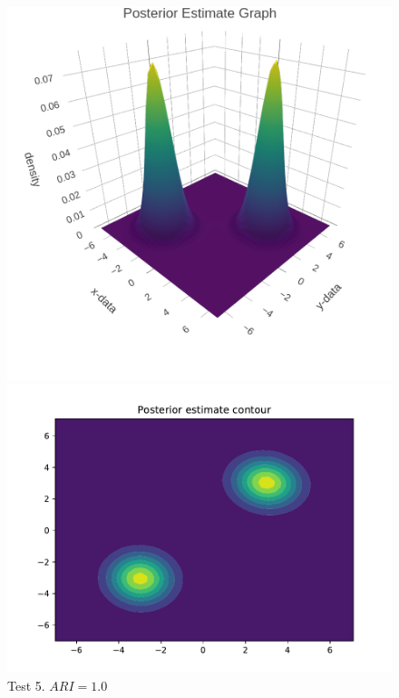 \begin{figure}[h]
	\centering
	\begin{minipage}{0.5\textwidth}
		\includegraphics[scale=0.5]{etc/test5_dens.png} %
	\end{minipage}%
	\begin{minipage}{0.5\textwidth}
		\includegraphics[scale=0.4]{etc/test5_cont.pdf}
	\end{minipage}
	\captionsetup{labelformat=empty}
	\caption{Test 5. $ARI = 1.0 $}
\end{figure}


